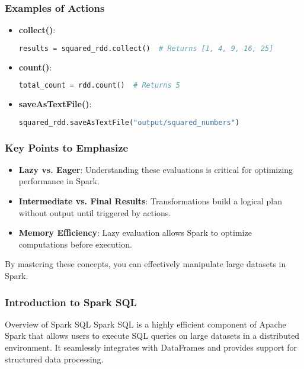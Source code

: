\documentclass[aspectratio=169]{beamer}
\begin{document}
\begin{frame}[fragile]
  \frametitle{Examples of Actions}
  \begin{itemize}
    \item \textbf{collect()}:
    \begin{lstlisting}[language=Python]
results = squared_rdd.collect()  # Returns [1, 4, 9, 16, 25]
    \end{lstlisting}
    
    \item \textbf{count()}:
    \begin{lstlisting}[language=Python]
total_count = rdd.count()  # Returns 5
    \end{lstlisting}
    
    \item \textbf{saveAsTextFile()}:
    \begin{lstlisting}[language=Python]
squared_rdd.saveAsTextFile("output/squared_numbers")
    \end{lstlisting}
  \end{itemize}
\end{frame}

\begin{frame}[fragile]
  \frametitle{Key Points to Emphasize}
  \begin{itemize}
    \item \textbf{Lazy vs. Eager}: Understanding these evaluations is critical for optimizing performance in Spark.
    \item \textbf{Intermediate vs. Final Results}: Transformations build a logical plan without output until triggered by actions.
    \item \textbf{Memory Efficiency}: Lazy evaluation allows Spark to optimize computations before execution.
  \end{itemize}
  By mastering these concepts, you can effectively manipulate large datasets in Spark.
\end{frame}

\begin{frame}[fragile]
    \frametitle{Introduction to Spark SQL}
    \begin{block}{Overview of Spark SQL}
        Spark SQL is a highly efficient component of Apache Spark that allows users to execute SQL queries on large datasets in a distributed environment. It seamlessly integrates with DataFrames and provides support for structured data processing.
    \end{block}
\end{frame}
\end{document}

